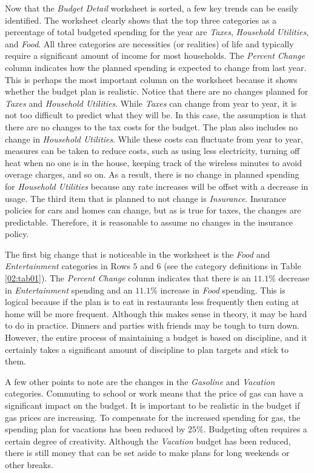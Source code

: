 Now that the \textit{Budget Detail} worksheet is sorted, a few key trends can be easily identified. The worksheet clearly shows that the top three categories as a percentage of total budgeted spending for the year are \textit{Taxes}, \textit{Household Utilities}, and \textit{Food}. All three categories are necessities (or realities) of life and typically require a significant amount of income for most households. The \textit{Percent Change} column indicates how the planned spending is expected to change from last year. This is perhaps the most important column on the worksheet because it shows whether the budget plan is realistic. Notice that there are no changes planned for \textit{Taxes} and \textit{Household Utilities}. While \textit{Taxes} can change from year to year, it is not too difficult to predict what they will be. In this case, the assumption is that there are no changes to the tax costs for the budget. The plan also includes no change in \textit{Household Utilities}. While these costs can fluctuate from year to year, measures can be taken to reduce costs, such as using less electricity, turning off heat when no one is in the house, keeping track of the wireless minutes to avoid overage charges, and so on. As a result, there is no change in planned spending for \textit{Household Utilities} because any rate increases will be offset with a decrease in usage. The third item that is planned to not change is \textit{Insurance}. Insurance policies for cars and homes can change, but as is true for taxes, the changes are predictable. Therefore, it is reasonable to assume no changes in the insurance policy.

The first big change that is noticeable in the worksheet is the \textit{Food} and \textit{Entertainment} categories in Rows $ 5 $ and $ 6 $ (see the category definitions in Table \ref{02:tab01}). The \textit{Percent Change} column indicates that there is an $ 11.1\% $ decrease in \textit{Entertainment} spending and an $ 11.1\% $ increase in \textit{Food} spending. This is logical because if the plan is to eat in restaurants less frequently then eating at home will be more frequent. Although this makes sense in theory, it may be hard to do in practice. Dinners and parties with friends may be tough to turn down. However, the entire process of maintaining a budget is based on discipline, and it certainly takes a significant amount of discipline to plan targets and stick to them.

A few other points to note are the changes in the \textit{Gasoline} and \textit{Vacation} categories. Commuting to school or work means that the price of gas can have a significant impact on the budget. It is important to be realistic in the budget if gas prices are increasing. To compensate for the increased spending for gas, the spending plan for vacations has been reduced by $ 25\% $. Budgeting often requires a certain degree of creativity. Although the \textit{Vacation} budget has been reduced, there is still money that can be set aside to make plans for long weekends or other breaks.

